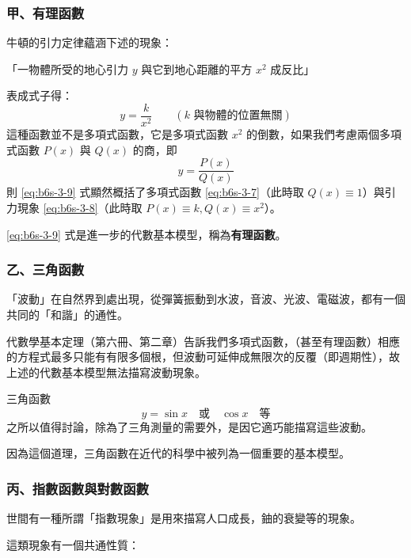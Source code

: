 \subsubsection*{甲、有理函數}\label{subsec:b6s-3-2-a}

牛頓的引力定律蘊涵下述的現象：

「一物體所受的地心引力 $y$ 與它到地心距離的平方 $x^2$ 成反比」

表成式子得：
\begin{equation}
y = \dfrac{k}{x^2} \qquad (k \text{ 與物體的位置無關}) \label{eq:b6s-3-8}
\end{equation}
這種函數並不是多項式函數，它是多項式函數 $x^2$ 的倒數，如果我們考慮兩個多項式函數 $P(x)$ 與 $Q(x)$ 的商，即
\begin{equation}
y = \dfrac{P(x)}{Q(x)} \label{eq:b6s-3-9}
\end{equation}
則 \eqref{eq:b6s-3-9} 式顯然概括了多項式函數 \eqref{eq:b6s-3-7}（此時取 $Q(x)\equiv 1$）與引力現象 \eqref{eq:b6s-3-8}（此時取 $P(x)\equiv k, Q(x)\equiv x^2$）。

\eqref{eq:b6s-3-9} 式是進一步的代數基本模型，稱為\textbf{有理函數}。

\subsubsection*{乙、三角函數}\label{subsec:b6s-3-2-b}

「波動」在自然界到處出現，從彈簧振動到水波，音波、光波、電磁波，都有一個共同的「和諧」的通性。

代數學基本定理（第六冊、第二章）告訴我們多項式函數，（甚至有理函數）相應的方程式最多只能有有限多個根，但波動可延伸成無限次的反覆（即週期性），故上述的代數基本模型無法描寫波動現象。

三角函數
\begin{equation}
y = \sin x \quad \text{或} \quad \cos x \quad \text{等} \label{eq:b6s-3-10}
\end{equation}
之所以值得討論，除為了三角測量的需要外，是因它適巧能描寫這些波動。

因為這個道理，三角函數在近代的科學中被列為一個重要的基本模型。

\subsubsection*{丙、指數函數與對數函數}\label{subsec:b6s-3-2-c}

世間有一種所謂「指數現象」是用來描寫人口成長，鈾的衰變等的現象。

這類現象有一個共通性質：

